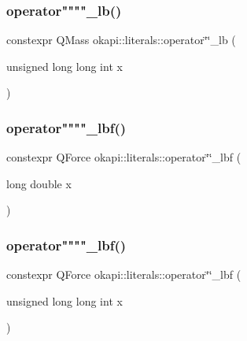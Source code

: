 \mbox{\label{namespaceokapi_1_1literals_aecb4217dbd2c589418f179d42e03a0bc}} 
\subsubsection{\texorpdfstring{operator""""\_lb()}{operator""\_lb()}\hspace{0.1cm}{\footnotesize\ttfamily [2/2]}}
{\footnotesize\ttfamily constexpr Q\+Mass okapi\+::literals\+::operator\char`\"{}\char`\"{}\+\_\+lb (\begin{DoxyParamCaption}\item[{unsigned long long int}]{x }\end{DoxyParamCaption})}

\mbox{\label{namespaceokapi_1_1literals_a7c3d4a2dc074ee653697a1c93c4b12fb}} 
\subsubsection{\texorpdfstring{operator""""\_lbf()}{operator""\_lbf()}\hspace{0.1cm}{\footnotesize\ttfamily [1/2]}}
{\footnotesize\ttfamily constexpr Q\+Force okapi\+::literals\+::operator\char`\"{}\char`\"{}\+\_\+lbf (\begin{DoxyParamCaption}\item[{long double}]{x }\end{DoxyParamCaption})}

\mbox{\label{namespaceokapi_1_1literals_ac4bd53d2c0d38c6af81494a2142f4263}} 
\subsubsection{\texorpdfstring{operator""""\_lbf()}{operator""\_lbf()}\hspace{0.1cm}{\footnotesize\ttfamily [2/2]}}
{\footnotesize\ttfamily constexpr Q\+Force okapi\+::literals\+::operator\char`\"{}\char`\"{}\+\_\+lbf (\begin{DoxyParamCaption}\item[{unsigned long long int}]{x }\end{DoxyParamCaption})}

